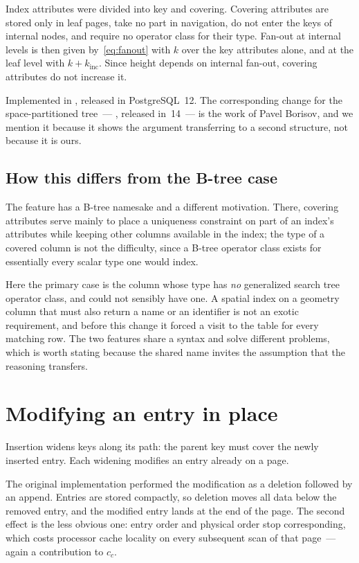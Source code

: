 Index attributes were divided into key and covering. Covering attributes are
stored only in leaf pages, take no part in navigation, do not enter the keys of
internal nodes, and require no operator class for their type. Fan-out at internal
levels is then given by~\eqref{eq:fanout} with $k$ over the key attributes alone,
and at the leaf level with $k + k_{\mathrm{inc}}$. Since height depends on
internal fan-out, covering attributes do not increase it.

Implemented in , released in PostgreSQL~12. The corresponding
change for the space-partitioned tree~--- , released in~14~---
is the work of Pavel Borisov, and we mention it because it shows the argument
transferring to a second structure, not because it is ours.

\subsection{How this differs from the B-tree case}

The feature has a B-tree namesake and a different motivation. There, covering
attributes serve mainly to place a uniqueness constraint on part of an index's
attributes while keeping other columns available in the index; the type of a
covered column is not the difficulty, since a B-tree operator class exists for
essentially every scalar type one would index.

Here the primary case is the column whose type has \emph{no} generalized search
tree operator class, and could not sensibly have one. A spatial index on a
geometry column that must also return a name or an identifier is not an exotic
requirement, and before this change it forced a visit to the table for every
matching row. The two features share a syntax and solve different problems, which
is worth stating because the shared name invites the assumption that the
reasoning transfers.

\section{Modifying an entry in place}
\label{sec:overwrite}

Insertion widens keys along its path: the parent key must cover the newly
inserted entry. Each widening modifies an entry already on a page.

The original implementation performed the modification as a deletion followed by
an append. Entries are stored compactly, so deletion moves all data below the
removed entry, and the modified entry lands at the end of the page. The second
effect is the less obvious one: entry order and physical order stop
corresponding, which costs processor cache locality on every subsequent scan of
that page~--- again a contribution to $c_c$.

